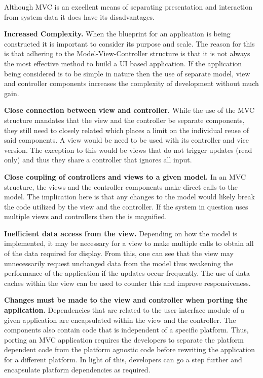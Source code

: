 Although MVC is an excellent means of separating presentation and interaction from system data it
does have its disadvantages. \par

\textbf {Increased Complexity.} When the blueprint for an application is being constructed it is important to consider its purpose
and scale. The reason for this is that adhering to the Model-View-Controller
structure is that it is not always the most effective method to build a UI based application. If the application being considered is
to be simple in nature then the use of separate model, view and controller components increases the complexity of development without
much gain. \par

\textbf{Close connection between view and controller.} While the use of the MVC structure mandates that the
view and the controller be separate components, they still need to closely related which places a limit on the individual
reuse of said components. A view would be need to be used with its controller and vice version. The exception to this would be
views that do not trigger updates (read only) and thus they share a controller that ignores all input.\par

\textbf{Close coupling of controllers and views to a given model.} In an MVC structure, the views and the controller components
make direct calls to the model. The implication here is that any changes to the model would likely break the code utilized by the view and
the controller. If the system in question uses multiple views and controllers then the is magnified. \par

\textbf{Inefficient data access from the view.} Depending on how the model is implemented, it may be necessary for a view to
make multiple calls to obtain all of the data required for display. From this, one can see that the view may unnecessarily request unchanged
data from the model thus weakening the performance of the application if the updates occur frequently. The use of data caches within the view can
be used to counter this and improve responsiveness.\par

\textbf{Changes must be made to the view and controller when porting the application.} Dependencies that are related to the user interface module
of a given application are encapsulated within the view and the controller. The components also contain code that is independent of a specific platform.
Thus, porting an MVC application requires the developers to separate the platform dependent code from the platform agnostic code before rewriting
the application for a different platform. In light of this, developers can go a step further and encapsulate platform dependencies as required.\par
